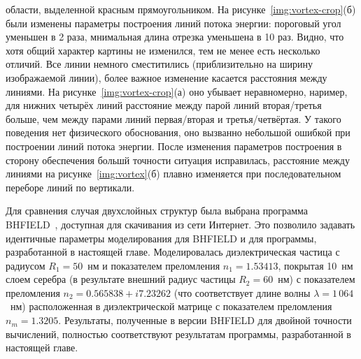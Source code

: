 области, выделенной красным прямоугольником. На
рисунке~\ref{img:vortex-crop}(б) были изменены параметры построения
линий потока энергии: пороговый угол уменьшен в 2 раза, мнимальная
длина отрезка уменьшена в 10 раз. Видно, что хотя общий характер
картины не изменился, тем не менее есть несколько отличий. Все линии
немного сместитились (приблизительно на ширину изображаемой линии), 
более важное изменение касается расстояния между линиями. На
рисунке~\ref{img:vortex-crop}(а) оно убывает неравномерно, наример,
для нижних четырёх линий расстояние между парой линий вторая/третья
больше, чем между парами линий первая/вторая и третья/четвёртая. У
такого поведения нет физического обоснования, оно вызванно небольшой
ошибкой при построении линий потока энергии.  После изменения
параметров построения в сторону обеспечения большй точности ситуация
исправилась, расстояние между линиями на рисунке~\ref{img:vortex}(б)
плавно изменяется при последовательном переборе линий по вертикали.
 
Для сравнения случая двухслойных структур была выбрана программа
BHFIELD~\cite{Suzuki-2008,Suzuki-2013}, доступная для скачивания из
сети Интернет.  Это позволило задавать идентичные параметры
моделирования для BHFIELD и для программы, разработанной в настоящей
главе. Моделировалась диэлектрическая частица с радиусом $R_1=50$~нм и
показателем преломления $n_1=1.53413$, покрытая 10~нм слоем серебра (в
результате внешний радиус частицы $R_2=60$~нм) с показателем
преломления $n_2=0.565838+i7.23262$ (что соответствует длине волны
$\lambda = 1\,064$~нм) расположенная в диэлектрической матрице с показателем
преломления $n_m=1.3205$.  Результаты, полученные в версии BHFIELD для
двойной точности вычислений, полностью соответствуют результатам
программы, разработанной в настоящей главе.

